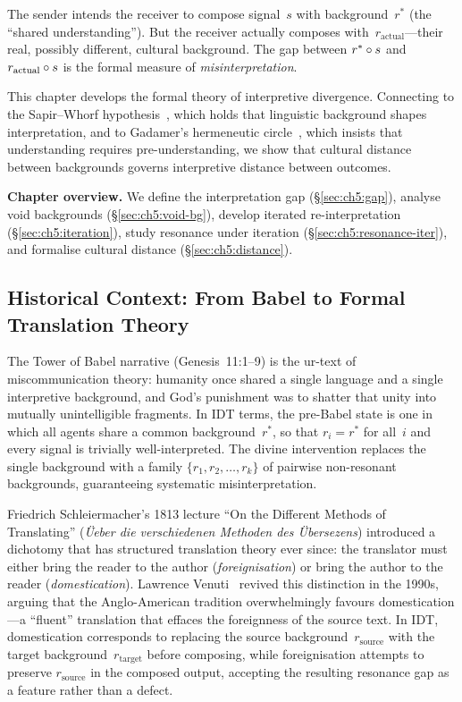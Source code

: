 The sender intends the receiver to compose signal~$s$ with
background~$r^*$ (the ``shared understanding'').  But the receiver
actually composes with~$r_{\mathrm{actual}}$---their real, possibly
different, cultural background.  The gap between
$r^* \circ s$ and $r_{\mathrm{actual}} \circ s$ is the formal
measure of \emph{misinterpretation}.

This chapter develops the formal theory of interpretive divergence.
Connecting to the Sapir--Whorf hypothesis~\cite{vygotsky1978}, which
holds that linguistic background shapes interpretation, and to Gadamer's
hermeneutic circle~\cite{gadamer1960}, which insists that understanding
requires pre-understanding, we show that cultural distance between
backgrounds governs interpretive distance between outcomes.

\medskip
\noindent\textbf{Chapter overview.}  We define the interpretation gap
(\S\ref{sec:ch5:gap}), analyse void backgrounds
(\S\ref{sec:ch5:void-bg}), develop iterated re-interpretation
(\S\ref{sec:ch5:iteration}), study resonance under iteration
(\S\ref{sec:ch5:resonance-iter}), and formalise cultural distance
(\S\ref{sec:ch5:distance}).

\subsection*{Historical Context: From Babel to Formal Translation Theory}

The Tower of Babel narrative (Genesis~11:1--9) is the ur-text of
miscommunication theory: humanity once shared a single language and a
single interpretive background, and God's punishment was to shatter that
unity into mutually unintelligible fragments.  In IDT terms, the
pre-Babel state is one in which all agents share a common
background~$r^*$, so that $r_i = r^*$ for all~$i$ and every signal is
trivially well-interpreted.  The divine intervention replaces the single
background with a family $\{r_1, r_2, \ldots, r_k\}$ of pairwise
non-resonant backgrounds, guaranteeing systematic misinterpretation.

Friedrich Schleiermacher's 1813 lecture ``On the Different Methods of
Translating'' (\textit{\"Ueber die verschiedenen Methoden des
\"Ubersezens}) introduced a dichotomy that has structured translation
theory ever since: the translator must either bring the reader to the
author (\emph{foreignisation}) or bring the author to the reader
(\emph{domestication}).  Lawrence Venuti~\cite{venuti1995} revived this
distinction in the 1990s, arguing that the Anglo-American tradition
overwhelmingly favours domestication---a ``fluent'' translation that
effaces the foreignness of the source text.  In IDT, domestication
corresponds to replacing the source background~$r_{\mathrm{source}}$
with the target background~$r_{\mathrm{target}}$ before composing,
while foreignisation attempts to preserve $r_{\mathrm{source}}$ in the
composed output, accepting the resulting resonance gap as a feature
rather than a defect.


